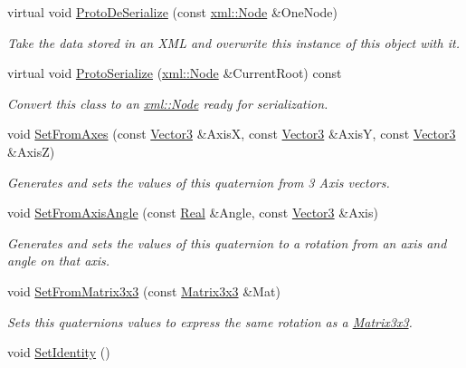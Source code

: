\begin{DoxyCompactItemize}
virtual void \hyperlink{classMezzanine_1_1Quaternion_a6cf6dcb5d3dcccec258b2e42157d8148}{ProtoDeSerialize} (const \hyperlink{classMezzanine_1_1xml_1_1Node}{xml::Node} \&OneNode)
\begin{DoxyCompactList}\small\item\em Take the data stored in an XML and overwrite this instance of this object with it. \item\end{DoxyCompactList}\item 
virtual void \hyperlink{classMezzanine_1_1Quaternion_a883d87f95630da6f626ce8e007a35642}{ProtoSerialize} (\hyperlink{classMezzanine_1_1xml_1_1Node}{xml::Node} \&CurrentRoot) const 
\begin{DoxyCompactList}\small\item\em Convert this class to an \hyperlink{classMezzanine_1_1xml_1_1Node}{xml::Node} ready for serialization. \item\end{DoxyCompactList}\item 
void \hyperlink{classMezzanine_1_1Quaternion_acb9d5c3d6b8092271a6c97cab0611efd}{SetFromAxes} (const \hyperlink{classMezzanine_1_1Vector3}{Vector3} \&AxisX, const \hyperlink{classMezzanine_1_1Vector3}{Vector3} \&AxisY, const \hyperlink{classMezzanine_1_1Vector3}{Vector3} \&AxisZ)
\begin{DoxyCompactList}\small\item\em Generates and sets the values of this quaternion from 3 Axis vectors. \item\end{DoxyCompactList}\item 
void \hyperlink{classMezzanine_1_1Quaternion_abc0e9ab4d7ebc2a9baa7775e99ec048d}{SetFromAxisAngle} (const \hyperlink{namespaceMezzanine_a726731b1a7df72bf3583e4a97282c6f6}{Real} \&Angle, const \hyperlink{classMezzanine_1_1Vector3}{Vector3} \&Axis)
\begin{DoxyCompactList}\small\item\em Generates and sets the values of this quaternion to a rotation from an axis and angle on that axis. \item\end{DoxyCompactList}\item 
void \hyperlink{classMezzanine_1_1Quaternion_a092755291dbcef94218359b6b7472f63}{SetFromMatrix3x3} (const \hyperlink{classMezzanine_1_1Matrix3x3}{Matrix3x3} \&Mat)
\begin{DoxyCompactList}\small\item\em Sets this quaternions values to express the same rotation as a \hyperlink{classMezzanine_1_1Matrix3x3}{Matrix3x3}. \item\end{DoxyCompactList}\item 
\hypertarget{classMezzanine_1_1Quaternion_a8f204c1529516ee03a80aa4f20613693}{
void \hyperlink{classMezzanine_1_1Quaternion_a8f204c1529516ee03a80aa4f20613693}{SetIdentity} ()}
\label{classMezzanine_1_1Quaternion_a8f204c1529516ee03a80aa4f20613693}


\end{DoxyCompactItemize}
